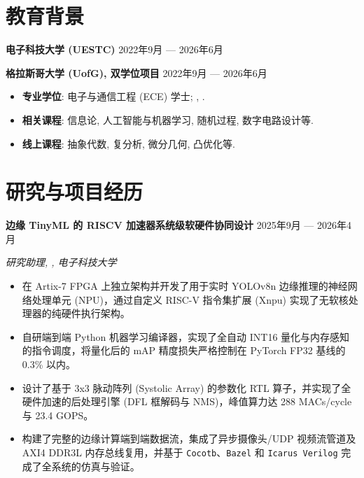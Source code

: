 \section{教育背景}

\textbf{电子科技大学 (UESTC)} \hfill 2022年9月 --- 2026年6月

\textbf{格拉斯哥大学 (UofG), 双学位项目} \hfill 2022年9月 --- 2026年6月

\begin{itemize}
    \setlength\itemsep{-0.5em}
    \setlength\topsep{0pt}
    \setlength\partopsep{0pt}
    \item \textbf{专业学位}: 电子与通信工程 (ECE) 学士; , .
    \item \textbf{相关课程}: 信息论, 人工智能与机器学习, 随机过程, 数字电路设计等.
    \item \textbf{线上课程}: 抽象代数, 复分析, 微分几何, 凸优化等.
\end{itemize}


\section{研究与项目经历}

\textbf{边缘 TinyML 的 RISCV 加速器系统级软硬件协同设计} \hfill 2025年9月 --- 2026年4月

\vspace{-0.5em} \begin{small} \textit{研究助理, , 电子科技大学} \end{small} \vspace{-0.5em}

\begin{itemize}
    \setlength\itemsep{-0.5em}
    \setlength\topsep{0pt}
    \setlength\partopsep{0pt}
    \item 在 Artix-7 FPGA 上独立架构并开发了用于实时 YOLOv8n 边缘推理的神经网络处理单元 (NPU)，通过自定义 RISC-V 指令集扩展 (Xnpu) 实现了无软核处理器的纯硬件执行架构。
    \item 自研端到端 Python 机器学习编译器，实现了全自动 INT16 量化与内存感知的指令调度，将量化后的 mAP 精度损失严格控制在 PyTorch FP32 基线的 0.3\% 以内。
    \item 设计了基于 3x3 脉动阵列 (Systolic Array) 的参数化 RTL 算子，并实现了全硬件加速的后处理引擎 (DFL 框解码与 NMS)，峰值算力达 288 MACs/cycle 与 23.4 GOPS。
    \item 构建了完整的边缘计算端到端数据流，集成了异步摄像头/UDP 视频流管道及 AXI4 DDR3L 内存总线复用，并基于 \texttt{Cocotb}、\texttt{Bazel} 和 \texttt{Icarus Verilog} 完成了全系统的仿真与验证。
\end{itemize}

